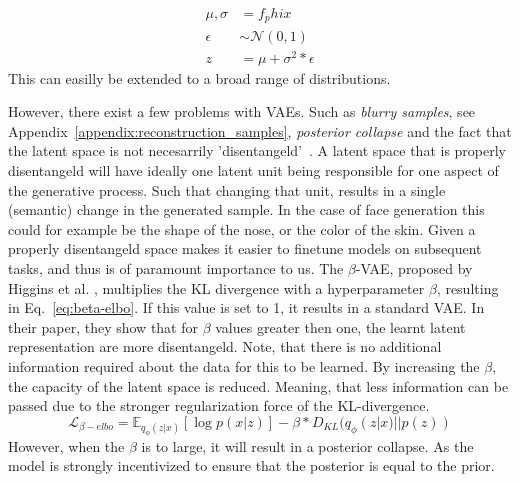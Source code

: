 \begin{equation}
    \begin{split}
        \mu, \sigma & = f_phi{x}                  \\
        \epsilon    & \sim \mathcal{N}(0, 1)      \\
        z           & = \mu + \sigma^2 * \epsilon
    \end{split}
    \label{eq:reparameterization-trick}
\end{equation}
This can easilly be extended to a broad range of distributions.

However, there exist a few problems with VAEs\cite{tomczak2021deep}. Such as \emph{blurry samples}, see Appendix~\ref{appendix:reconstruction_samples}, \emph{posterior collapse}\cite{DBLP:journals/corr/BowmanVVDJB15} and the fact that the latent space is not necesarrily 'disentangeld'~\cite{higgins2017betavae}. A latent space that is properly disentangeld will have ideally one latent unit being responsible for one aspect of the generative process. Such that changing that unit, results in a single (semantic) change in the generated sample. In the case of face generation this could for example be the shape of the nose, or the color of the skin. Given a properly disentangeld space makes it easier to finetune models on subsequent tasks\cite{bengio2014representationlearningreviewnew}, and thus is of paramount importance to us. The $\beta$-VAE, proposed by Higgins et al. \cite{higgins2017betavae}, multiplies the KL divergence with a hyperparameter $\beta$, resulting in Eq.~\ref{eq:beta-elbo}. If this value is set to 1, it results in a standard VAE. In their paper, they show that for $\beta$ values greater then one, the learnt latent representation are more disentangeld. Note, that there is no additional information required about the data for this to be learned. By increasing the $\beta$, the capacity of the latent space is reduced. Meaning, that less information can be passed due to the stronger regularization force of the KL-divergence.
\begin{equation}
    \mathcal{L}_{\beta-elbo} = \mathbb{E}_{q_{\phi}(z|x)}[\log p(x|z)] - \beta * D_{KL}(q_{\phi}(z|x) || p(z))
    \label{eq:beta-elbo}
\end{equation}
However, when the $\beta$ is to large, it will result in a posterior collapse. As the model is strongly incentivized to ensure that the posterior is equal to the prior.

